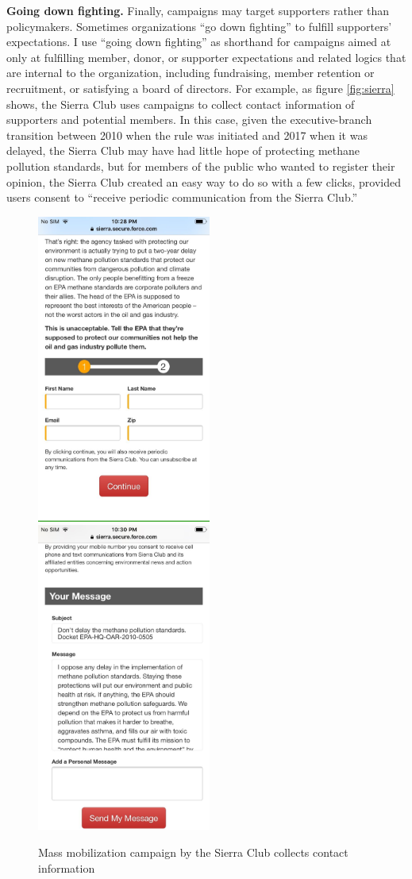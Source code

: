 \begin{subhyp}
\textbf{Going down fighting.} Finally, campaigns may target supporters rather than policymakers. Sometimes organizations ``go down fighting'' to fulfill supporters' expectations.
I use ``going down fighting'' as shorthand for campaigns aimed at only at fulfilling member, donor, or supporter expectations and related logics that are internal to the organization, including fundraising, member retention or recruitment, or satisfying a board of directors. For example, as figure \ref{fig:sierra} shows, the Sierra Club uses campaigns to collect contact information of supporters and potential members. In this case, given the executive-branch transition between 2010 when the rule was initiated and 2017 when it was delayed, the Sierra Club may have had little hope of protecting methane pollution standards, but for members of the public who wanted to register their opinion, the Sierra Club created an easy way to do so with a few clicks, provided users consent to ``receive periodic communication from the Sierra Club.'' 
\begin{figure}
    \caption{Mass mobilization campaign by the Sierra Club collects contact information}
    \centering
    \includegraphics[height = 4in]{Figs/sierra1.jpeg}
    \includegraphics[height = 4in]{Figs/sierra2.jpeg}

\end{figure}
\end{subhyp}
